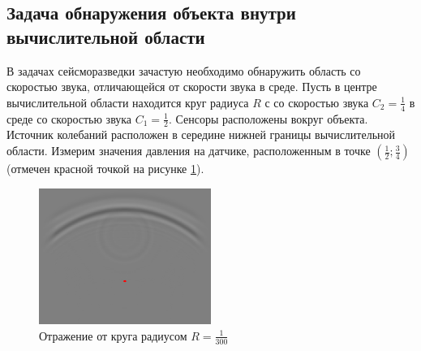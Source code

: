 \documentclass[a4paper, fontsize=14pt]{article}
\begin{document}
\subsection{Задача обнаружения объекта внутри вычислительной области}
В задачах сейсморазведки зачастую необходимо обнаружить область со скоростью звука, отличающейся от
скорости звука в среде. Пусть в центре вычислительной области находится круг радиуса $R$ с со
скоростью звука $C_2 = \frac{1}{4}$ в среде со скоростью звука $C_1 = \frac{1}{2}$. Сенсоры
расположены вокруг объекта. Источник колебаний расположен в середине нижней границы вычислительной области.
Измерим значения давления на датчике, расположенным в точке $\left(\frac{1}{2};\frac{3}{4}\right)$
(отмечен красной точкой на рисунке \ref{detector}).
\begin{figure}
	\centering
	\includegraphics[width=0.5\textwidth]{detector.eps}
	\caption{Отражение от круга радиусом $R=\frac{1}{300}$}
	\label{detector}
\end{figure}
\end{document}
